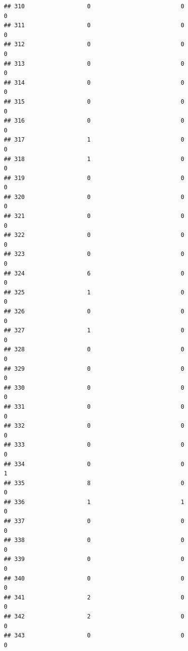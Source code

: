 \documentclass[
]{article}
\begin{document}
\begin{verbatim}
## 310                  0                          0                       0
## 311                  0                          0                       0
## 312                  0                          0                       0
## 313                  0                          0                       0
## 314                  0                          0                       0
## 315                  0                          0                       0
## 316                  0                          0                       0
## 317                  1                          0                       0
## 318                  1                          0                       0
## 319                  0                          0                       0
## 320                  0                          0                       0
## 321                  0                          0                       0
## 322                  0                          0                       0
## 323                  0                          0                       0
## 324                  6                          0                       0
## 325                  1                          0                       0
## 326                  0                          0                       0
## 327                  1                          0                       0
## 328                  0                          0                       0
## 329                  0                          0                       0
## 330                  0                          0                       0
## 331                  0                          0                       0
## 332                  0                          0                       0
## 333                  0                          0                       0
## 334                  0                          0                       1
## 335                  8                          0                       0
## 336                  1                          1                       0
## 337                  0                          0                       0
## 338                  0                          0                       0
## 339                  0                          0                       0
## 340                  0                          0                       0
## 341                  2                          0                       0
## 342                  2                          0                       0
## 343                  0                          0                       0

\end{verbatim}
\end{document}
